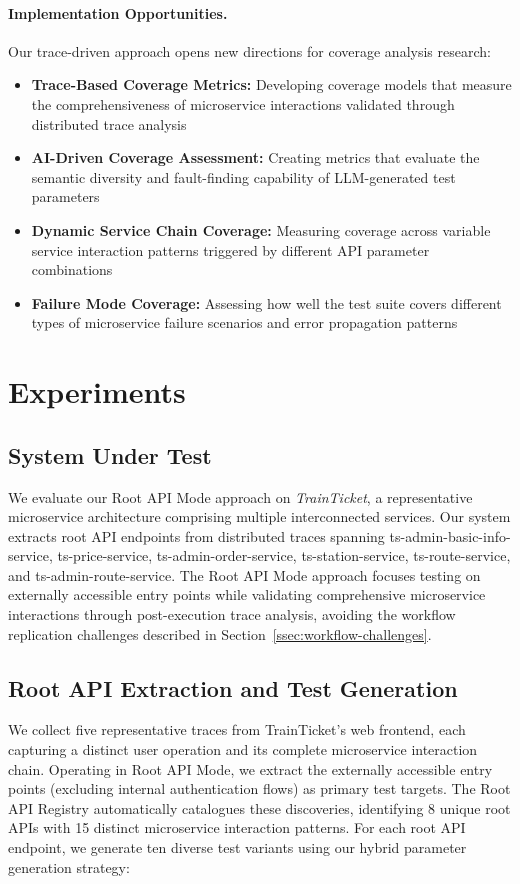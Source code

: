 \documentclass[conference]{IEEEtran}
\begin{document}
\paragraph{Implementation Opportunities.}
Our trace-driven approach opens new directions for coverage analysis research:
\begin{itemize}[leftmargin=*]
    \item \textbf{Trace-Based Coverage Metrics:} Developing coverage models that measure the comprehensiveness of microservice interactions validated through distributed trace analysis
    \item \textbf{AI-Driven Coverage Assessment:} Creating metrics that evaluate the semantic diversity and fault-finding capability of LLM-generated test parameters
    \item \textbf{Dynamic Service Chain Coverage:} Measuring coverage across variable service interaction patterns triggered by different API parameter combinations
    \item \textbf{Failure Mode Coverage:} Assessing how well the test suite covers different types of microservice failure scenarios and error propagation patterns
\end{itemize}




\section{Experiments}\label{sec:experiments}

\subsection{System Under Test}
We evaluate our Root API Mode approach on \emph{TrainTicket}, a representative microservice architecture comprising multiple interconnected services. Our system extracts root API endpoints from distributed traces spanning ts-admin-basic-info-service, ts-price-service, ts-admin-order-service, ts-station-service, ts-route-service, and ts-admin-route-service. The Root API Mode approach focuses testing on externally accessible entry points while validating comprehensive microservice interactions through post-execution trace analysis, avoiding the workflow replication challenges described in Section~\ref{ssec:workflow-challenges}.

\subsection{Root API Extraction and Test Generation}
We collect five representative traces from TrainTicket's web frontend, each capturing a distinct user operation and its complete microservice interaction chain. Operating in Root API Mode, we extract the externally accessible entry points (excluding internal authentication flows) as primary test targets. The Root API Registry automatically catalogues these discoveries, identifying 8 unique root APIs with 15 distinct microservice interaction patterns. For each root API endpoint, we generate ten diverse test variants using our hybrid parameter generation strategy:
\end{document}
